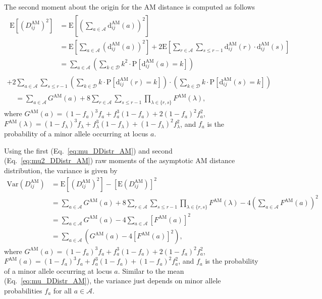 \documentclass[aos]{imsart}
\begin{document}
The second moment about the origin for the AM distance is computed as follows
%
\begin{equation}\label{eq:mu2_DDistr_AM}
\begin{split}
\begin{aligned}
\text{E}\left[\left(D^\text{AM}_{ij}\right)^2\right] &= \text{E}\left[\left(\sum_{a \in \mathcal{A}} \text{d}^\text{AM}_{ij}(a)\right)^2\right] \\
&= \text{E}\left[\sum_{a \in \mathcal{A}} \left(\text{d}^\text{AM}_{ij}(a)\right)^2\right] + 2 \text{E}\left[\sum_{r \in \mathcal{A}} \sum_{s \leq r - 1} \text{d}^\text{AM}_{ij}(r) \cdot \text{d}^\text{AM}_{ij}(s)\right] \\
&= \sum_{a \in \mathcal{A}} \left(\sum_{k \in \mathcal{D}} k^2 \cdot \text{P}\left[\text{d}^\text{AM}_{ij}(a) = k\right]\right)
\end{aligned}\\
+ 2\sum_{a \in \mathcal{A}} \sum_{s \leq r - 1} \left(\sum_{k \in \mathcal{D}} k \cdot \text{P}\left[\text{d}^\text{AM}_{ij}(r) = k\right]\right) \cdot \left(\sum_{k \in \mathcal{D}} k \cdot \text{P}\left[\text{d}^\text{AM}_{ij}(s) = k\right]\right) \\
\begin{aligned}
&= \sum_{a \in \mathcal{A}} G^\text{AM}(a) + 8 \sum_{r \in \mathcal{A}} \sum_{s \leq r - 1} \prod_{\lambda \in \{r,s\}} F^\text{AM}(\lambda),
\end{aligned}
\end{split}
\end{equation}
%
where $G^\text{AM}(a) = (1 - f_a)^3 f_a + f^3_a (1 - f_a) + 2 (1 - f_a)^2 f^2_a$, $F^\text{AM}(\lambda) = (1 - f_\lambda)^3 f_\lambda + f^3_\lambda (1 - f_\lambda) + (1 - f_\lambda)^2 f^2_\lambda$, and $f_a$ is the probability of a minor allele occurring at locus $a$.

Using the first (Eq.~\ref{eq:mu_DDistr_AM}) and second (Eq.~\ref{eq:mu2_DDistr_AM}) raw moments of the asymptotic AM distance distribution, the variance is given by
%
\begin{equation}\label{eq:var_DDistr_AM}
\begin{aligned}
\text{Var}\left(D^\text{AM}_{ij}\right) &= \text{E}\left[\left(D^\text{AM}_{ij}\right)^2\right] - \left[\text{E}\left(D^\text{AM}_{ij}\right)\right]^2 \\
&= \sum_{a \in \mathcal{A}} G^\text{AM}(a) + 8\sum_{r \in \mathcal{A}} \sum_{s \leq r - 1} \prod_{\lambda \in \{r,s\}} F^\text{AM}(\lambda) - 4\left(\sum_{a \in \mathcal{A}}F^\text{AM}(a)\right)^2 \\
&= \sum_{a \in \mathcal{A}} G^\text{AM}(a) - 4\sum_{a \in \mathcal{A}}\left[F^\text{AM}(a)\right]^2 \\
&= \sum_{a \in \mathcal{A}} \left(G^\text{AM}(a)- 4\left[F^\text{AM}(a)\right]^2\right),
\end{aligned}
\end{equation}
%
where $G^\text{AM}(a) = (1 - f_a)^3 f_a + f^3_a (1 - f_a) + 2 (1 - f_a)^2 f^2_a$, $F^\text{AM}(a) = (1 - f_a)^3 f_a + f^3_a (1 - f_a) + (1 - f_a)^2 f^2_a$, and $f_a$ is the probability of a minor allele occurring at locus $a$. Similar to the mean (Eq.~\ref{eq:mu_DDistr_AM}), the variance just depends on minor allele probabilities $f_a$ for all $a \in \mathcal{A}$.
\end{document}
